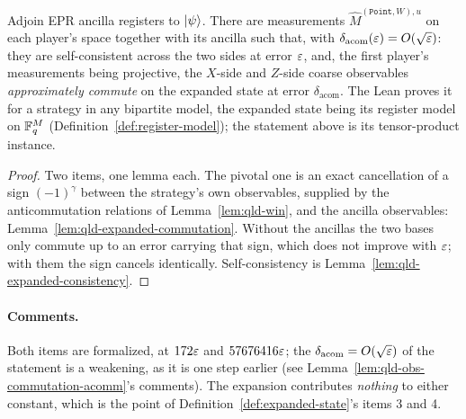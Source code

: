 \begin{lemma}
\label{lem:qld-expanded-points}
\leanok
Adjoin EPR ancilla registers to $|\psi\rangle$. There are measurements
$\widehat{M}^{(\mathtt{Point}, W), u}$ on each player's space together with its ancilla such
that, with $\delta_{\mathrm{acom}}(\varepsilon) = O(\sqrt{\varepsilon})$: they are self-consistent across
the two sides at error $\varepsilon$, and, the first player's measurements being projective, the
$X$-side and $Z$-side coarse observables \emph{approximately commute} on the expanded state at
error $\delta_{\mathrm{acom}}$. The Lean proves it for a strategy in any bipartite model, the
expanded state being its register model on $\mathbb{F}_q^M$ (Definition~\ref{def:register-model}); the
statement above is its tensor-product instance.
\end{lemma}

\begin{proof}
\leanok
{}
Two items, one lemma each. The pivotal one is an exact cancellation of a sign $(-1)^\gamma$ between
the strategy's own observables, supplied by the anticommutation relations of
Lemma~\ref{lem:qld-win}, and the ancilla observables: Lemma~\ref{lem:qld-expanded-commutation}.
Without the ancillas the two bases only commute up to an error carrying that sign, which does not
improve with $\varepsilon$; with them the sign cancels identically. Self-consistency is
Lemma~\ref{lem:qld-expanded-consistency}.
\end{proof}

\paragraph{Comments.} Both items are formalized, at $172\varepsilon$ and $57676416\varepsilon$; the
$\delta_{\mathrm{acom}} = O(\sqrt{\varepsilon})$ of the statement is a weakening, as it is one step
earlier (see Lemma~\ref{lem:qld-obs-commutation-acomm}'s comments). The expansion contributes
\emph{nothing} to either constant, which is the point of
Definition~\ref{def:expanded-state}'s items 3 and 4.

